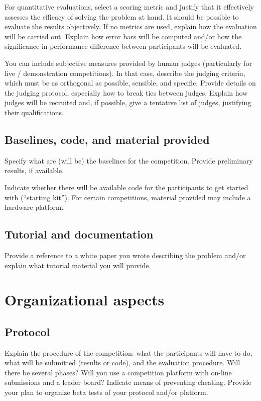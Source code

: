 \documentclass[11pt, oneside]{article}
\begin{document}
For quantitative evaluations, select a scoring metric and justify
that it effectively assesses the efficacy of solving the problem
at hand. It should be possible to evaluate the results
objectively. If no metrics are used, explain how the evaluation
will be carried out. Explain how error bars will be computed and/or how the significance in performance difference between participants will be evaluated.

You can include subjective measures provided by human judges (particularly for live /  demonstration competitions). In that case, describe the judging criteria, which must be as orthogonal as possible, sensible, and specific. Provide details on the judging protocol, especially how to break ties between judges. Explain how judges will be recruited and, if possible, give a tentative list of judges, justifying their qualifications.  

\subsection{Baselines, code, and material provided}

Specify what are (will be) the baselines for the competition. Provide preliminary results, if available.

Indicate
whether there will be available code for the participants to get started with (``starting kit''). For certain competitions, material provided may include a hardware platform.

\subsection{Tutorial and documentation}

Provide a reference to a white paper you wrote describing the
problem and/or explain what tutorial material you will provide.


\section{Organizational aspects}
\subsection{Protocol}

Explain the procedure of the competition: what the participants will have to do, what will be submitted (results or code), and the evaluation procedure.
Will there be several phases? Will you use a competition platform with on-line submissions and a leader board? Indicate means of preventing cheating.
Provide your plan to organize beta tests of your protocol and/or platform.
\end{document}
